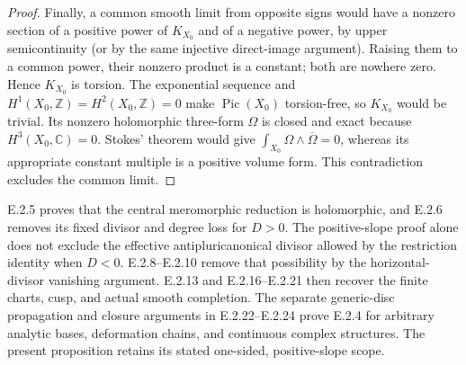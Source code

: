 \begin{proof}
Finally, a common smooth limit from opposite signs would
have a nonzero section of a positive power of $K_{X_0}$
and of a negative power, by upper semicontinuity (or by
the same injective direct-image argument).  Raising them
to a common power, their nonzero product is a constant;
both are nowhere zero.  Hence $K_{X_0}$ is torsion.
The exponential sequence and $H^1(X_0,\mathbb Z)=
H^2(X_0,\mathbb Z)=0$ make $\operatorname{Pic}(X_0)$
torsion-free, so $K_{X_0}$ would be trivial.  Its nonzero
holomorphic three-form $\Omega$ is closed and exact because
$H^3(X_0,\mathbb C)=0$.  Stokes' theorem would give
$\int_{X_0}\Omega\wedge\overline\Omega=0$, whereas its
appropriate constant multiple is a positive volume form.
This contradiction excludes the common limit.
\end{proof}

\begin{remark}
E.2.5 proves that the central meromorphic reduction is
holomorphic, and E.2.6 removes its fixed divisor and degree
loss for $D>0$.  The positive-slope proof alone does not
exclude the effective antipluricanonical divisor allowed
by the restriction identity when $D<0$.  E.2.8--E.2.10
remove that possibility by the horizontal-divisor vanishing
argument.  E.2.13 and E.2.16--E.2.21 then recover the finite
charts, cusp, and actual smooth completion.  The separate
generic-disc propagation and closure arguments in
E.2.22--E.2.24 prove E.2.4 for arbitrary analytic bases,
deformation chains, and continuous complex structures.
The present proposition retains its stated one-sided,
positive-slope scope.
\end{remark}

